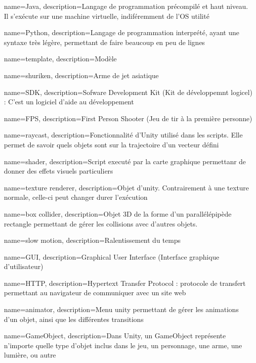{
  name=Java,
  description={Langage de programmation précompilé et haut niveau. Il s'exécute sur une machine virtuelle, indiféremment de l'OS utilité}
}

{
  name=Python,
  description={Langage de programmation interprété, ayant une syntaxe très légère, permettant de faire beaucoup en peu de lignes}
}

{
  name=template,
  description={Modèle}
}

{
  name=shuriken,
  description={Arme de jet asiatique}
}

{
  name=SDK,
  description={Sofware Development Kit (Kit de développemnt logicel) : C'est un logiciel d'aide au développement}
}

{
  name=FPS,
  description={First Person Shooter (Jeu de tir à la première personne)}
}

{
  name=raycast,
  description={Fonctionnalité d'Unity utilisé dans les scripts. Elle permet de savoir quels objets sont sur la trajectoire d'un vecteur défini}
}

{
  name=shader,
  description={Script executé par la carte graphique permettanr de donner des effets visuels particuliers}
}

{
  name=texture renderer,
  description={Objet d'unity. Contrairement à une texture normale, celle-ci peut changer durer l'exécution}
}

{
  name=box collider,
  description={Objet 3D de la forme d'un parallélépipède rectangle permettant de gérer les collisions avec d'autres objets.}
}

{
  name=slow motion,
  description={Ralentissement du temps}
}

{
  name=GUI,
  description={Graphical User Interface (Interface graphique d'utilisateur)}
}

{
  name=HTTP,
  description={Hypertext Transfer Protocol : protocole de transfert permettant au navigateur de communiquer avec un site web}
}

{
  name=animator,
  description={Menu unity permettant de gérer les animations d'un objet, ainsi que les différentes transitions}
}

{
  name=GameObject,
  description={Dans Unity, un GameObject représente n'importe quelle type d'objet inclus dans le jeu, un personnage, une arme, une lumière, ou autre}
}

